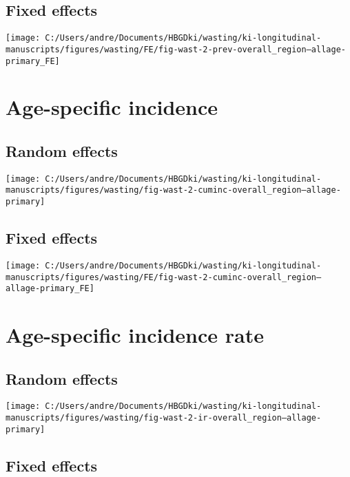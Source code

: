 \documentclass[
  9pt,
]{book}
\begin{document}
\hypertarget{fixed-effects-1}{%
\subsection{Fixed effects}\label{fixed-effects-1}}

\texttt{[image: C:/Users/andre/Documents/HBGDki/wasting/ki-longitudinal-manuscripts/figures/wasting/FE/fig-wast-2-prev-overall\_region--allage-primary\_FE]}

\hypertarget{age-specific-incidence}{%
\section{Age-specific incidence}\label{age-specific-incidence}}

\hypertarget{random-effects-1}{%
\subsection{Random effects}\label{random-effects-1}}

\texttt{[image: C:/Users/andre/Documents/HBGDki/wasting/ki-longitudinal-manuscripts/figures/wasting/fig-wast-2-cuminc-overall\_region--allage-primary]}

\hypertarget{fixed-effects-2}{%
\subsection{Fixed effects}\label{fixed-effects-2}}

\texttt{[image: C:/Users/andre/Documents/HBGDki/wasting/ki-longitudinal-manuscripts/figures/wasting/FE/fig-wast-2-cuminc-overall\_region--allage-primary\_FE]}

\hypertarget{age-specific-incidence-rate}{%
\section{Age-specific incidence rate}\label{age-specific-incidence-rate}}

\hypertarget{random-effects-2}{%
\subsection{Random effects}\label{random-effects-2}}

\texttt{[image: C:/Users/andre/Documents/HBGDki/wasting/ki-longitudinal-manuscripts/figures/wasting/fig-wast-2-ir-overall\_region--allage-primary]}

\hypertarget{fixed-effects-3}{%
\subsection{Fixed effects}\label{fixed-effects-3}}
\end{document}
